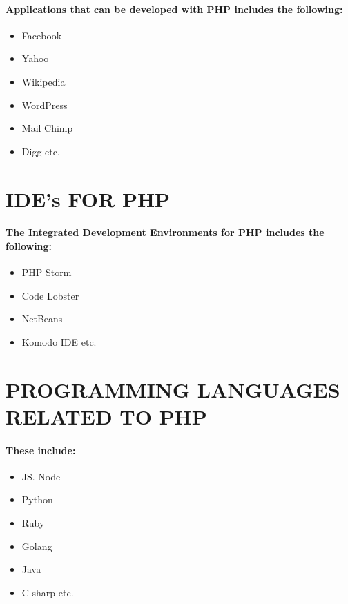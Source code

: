 \documentclass{article}
\begin{document}
\paragraph{Applications that can be developed with PHP includes the following:
}
\begin{itemize}
	\item Facebook
	\item Yahoo
	\item Wikipedia
	\item WordPress
	\item Mail Chimp
	\item Digg etc.
\end{itemize}
\newpage
\section*{IDE’s FOR PHP}
\paragraph{The Integrated Development Environments for PHP includes the following:}
\begin{itemize}
	\item PHP Storm
	\item Code Lobster
	\item NetBeans
	\item Komodo IDE etc.
\end{itemize}
\newpage
\section*{PROGRAMMING LANGUAGES RELATED TO PHP}
\paragraph{These include:
}
\begin{itemize}
	\item JS. Node
	\item Python
	\item Ruby
	\item Golang
	\item Java
	\item C sharp etc.
\end{itemize}
\newpage
\pagecolor{white}
\color{black}
\end{document}
